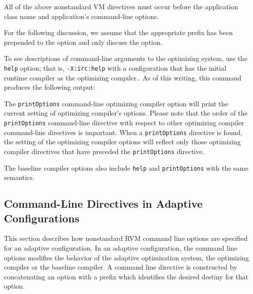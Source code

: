 All of the above nonstandard VM directives must occur before 
the application class name and application's command-line options.

For the following discussion, we assume that the appropriate prefix has been
prepended to the option and only discuss the option.

To see descriptions of command-line arguments to the optimizing system, use
the {\tt help} option; that is, {\tt -X:irc:help} with a configuration that
has the initial runtime compiler as the optimizing compiler..  
As of this writing, this command produces the following output:



The {\tt printOptions} command-line optimizing compiler option will print
the current setting of optimizing compiler's options.  Please note that the 
order of the {\tt printOptions} command-line directive with respect to other
optimizing compiler command-line directives is important.  
When a {\tt printOptions} directive is found, the setting of the optimizing 
compiler options will reflect only those optimizing compiler directives
that have preceded the {\tt printOptions} directive.  

The baseline compiler options also include {\tt help} and {\tt printOptions}
with the same semantics.

\subsection{Command-Line Directives in Adaptive Configurations}
\label{subsection:adaptive:cmdline}

This section describes how nonstandard RVM command line options are 
specified for an adaptive configuration.
In an adaptive configuration, the command line options modifies
the behavior of the adaptive optimization system,
the optimizing compiler or the baseline compiler.
A command line directive is constructed by concatenating an option 
with a prefix which identifies the desired destiny for that option.

